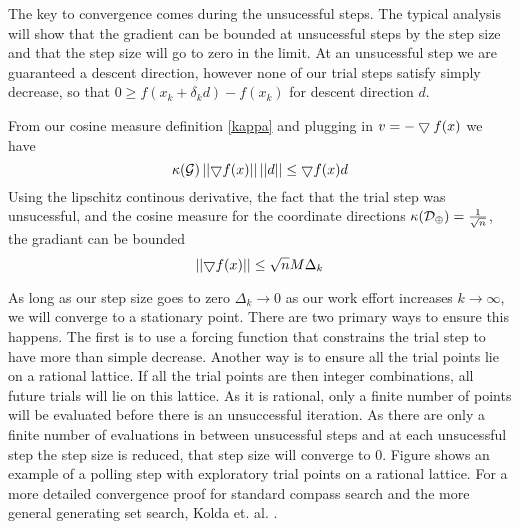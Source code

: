 The key to convergence comes during the unsucessful steps.  The typical analysis will show that the gradient can be bounded at unsucessful steps by the step size and that the step size will go to zero in the limit.  At an unsucessful step we are guaranteed a descent direction, however none of our trial steps satisfy simply decrease, so that $0\geq f(x_k + \delta_k d) - f(x_k)$ for descent direction $d$.  
\begin{comment}
Using the continous derivative assumption, the mean value theorem says there is a point in the middle $(\alpha \in [0,1])$ with 
\begin{equation*}
0\geq f(x_k + \delta_k d) - f(x_k) = \grad f(x_k + \alpha_k \Delta_k d)^T \Delta_k d
\end{equation*}
and subtracting $\grad f(x_k) \Delta_k d$ from both sides will give us a change in gradients.
\begin{equation*}
 - \Delta_k \grad f(x)^T d \leq \left[ \grad f(x_k + \alpha_k \Delta_k d)  - \grad f(x_k ) \right]^T \Delta_k d
\end{equation*}
Finally, using the defination of the Lipschitz continous derivative, we have
\begin{equation}
-\Delta_k \grad f(x)^T d \leq M \Delta_k d
\end{equation}
 compass search specifically , and plugging in $v = -\grad f(x)$, we have bound
\end{comment}
From our cosine measure definition \ref{kappa} and plugging in $v = -\bigtriangledown f(x)$ we have
\begin{equation}
\kappa (\mathcal{G}) \left| \left| {\bigtriangledown f(x)} \right| \right| \left| \left| {d} \right| \right| \leq \bigtriangledown f(x) d
\end{equation}
Using the lipschitz continous derivative, the fact that the trial step was unsucessful, and the cosine measure for the coordinate directions $\kappa (\mathcal{D}_\oplus)=\frac{1}{\sqrt{n}}$, the gradiant can be bounded 
\begin{equation}
\left| \left| {\bigtriangledown f(x)} \right| \right| \leq \sqrt{n} M \Delta_k
\end{equation}

As long as our step size goes to zero $\Delta_k \rightarrow 0$ as our work effort increases $k\rightarrow \infty$, we will converge to a stationary point.  There are two primary ways to ensure this happens.  The first is to use a forcing function that constrains the trial step to have more than simple decrease.  Another way is to ensure all the trial points lie on a rational lattice.  If all the trial points are then integer combinations, all future trials will lie on this lattice.  As it is rational, only a finite number of points will be evaluated before there is an unsuccessful iteration.  As there are only a finite number of evaluations in between unsucessful steps and at each unsucessful step the step size is reduced, that step size will converge to 0.  Figure \label{fig:explore} shows an example of a polling step with exploratory trial points on a rational lattice. For a more detailed convergence proof for standard compass search and the more general generating set search, Kolda et. al. \cite{kolda_2003}.



